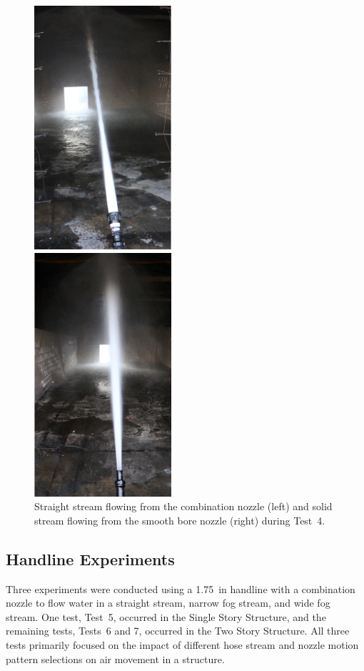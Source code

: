 \documentclass[12pt,oneside]{book}
\begin{document}
\begin{figure}[!ht]
	\minipage{2.15in}
	\begin{center}
		\includegraphics[width=2in]{../Figures/Pictures/SS_70}
	\end{center} 
	\endminipage
	\minipage{2.15in}
	\begin{center}
		\includegraphics[width=2in]{../Figures/Pictures/SB_70}
	\end{center}
	\endminipage
	\caption[Straight stream from combination nozzle and solid stream from smooth bore nozzle with 1~in tip during Test~4.]{Straight stream flowing from the combination nozzle (left) and solid stream flowing from the smooth bore nozzle (right) during Test~4.}
	\label{fig:test_4_pic}
\end{figure}
\FloatBarrier

\subsection{Handline Experiments}
\label{sec:handline_procedure}
Three experiments were conducted using a 1.75~in handline with a combination nozzle to flow water in a straight stream, narrow fog stream, and wide fog stream. One test, Test~5, occurred in the Single Story Structure, and the remaining tests, Tests~6 and 7, occurred in the Two Story Structure. All three tests primarily focused on the impact of different hose stream and nozzle motion pattern selections on air movement in a structure. 
\end{document}
